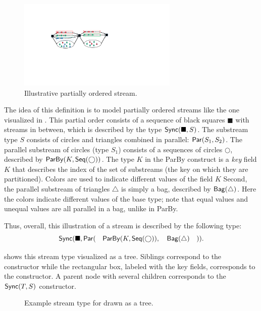 \begin{figure}
  \centering
  \includegraphics[width=3in]{figures/synchschemas/SPS2.pdf}
  \caption{Illustrative partially ordered stream.}
  \label{fig:ex-postream}
\end{figure}

The idea of this definition is to model partially ordered streams like the one visualized in .
This partial order consists of a sequence of black squares $\blacksquare$ with streams in between, which is described by the type $\mathsf{Sync}({\blacksquare}, S)$.
The substream type $S$ consists of circles and triangles combined in parallel: $\mathsf{Par}({S_1}, {S_2})$.
The parallel substream of circles (type $S_1$) consists of a sequences of circles $\bigcirc$, described by $\mathsf{ParBy}({K}, \mathsf{Seq}({\bigcirc}))$.
The type $K$ in the ParBy construct is a \emph{key} field $K$ that describes the index of the set of substreams (the key on which they are partitioned).
Colors are used to indicate different values of the field $K$
Second, the parallel substream of triangles $\triangle$ is simply a bag, described by $\mathsf{Bag}({\triangle})$.
Here the colors indicate different values of the base type; note that equal values and unequal values are all parallel in a bag, unlike in ParBy.

Thus, overall, this illustration of a stream is described by the following type:
\[
\mathsf{Sync}({\blacksquare}, \mathsf{Par}({ \quad \mathsf{ParBy}({K}, \mathsf{Seq}({\bigcirc}))}, {\quad \mathsf{Bag}({\triangle}) \quad})).
\]

 shows this stream type visualized as a tree.
Siblings correspond to the  constructor while the rectangular box,
labeled with the key fields, corresponds to the  constructor.
A parent node with several children corresponds to the $\mathsf{Sync}({T}, S)$ constructor.

\begin{figure}[t]
  \centering
  \caption{Example stream type for  drawn as a tree.}
  \label{45:fig:example-schema}
\end{figure}


